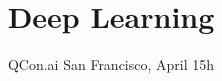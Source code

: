 


\title{Deep Learning}
\author{}
\date{QCon.ai San Francisco, April 15h}


\begin{frame}
	\titlepage
\end{frame}







